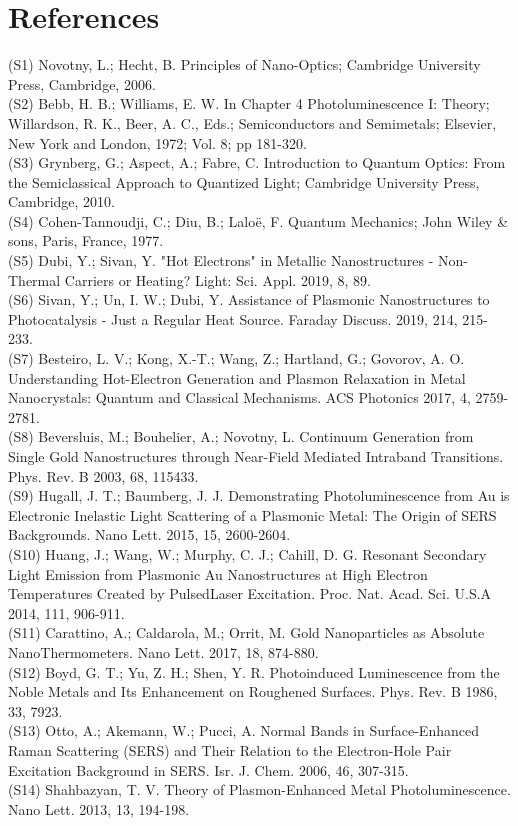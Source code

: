 \documentclass[10pt]{article}
\begin{document}
\section*{References}
(S1) Novotny, L.; Hecht, B. Principles of Nano-Optics; Cambridge University Press, Cambridge, 2006.\\
(S2) Bebb, H. B.; Williams, E. W. In Chapter 4 Photoluminescence I: Theory; Willardson, R. K., Beer, A. C., Eds.; Semiconductors and Semimetals; Elsevier, New York and London, 1972; Vol. 8; pp 181-320.\\
(S3) Grynberg, G.; Aspect, A.; Fabre, C. Introduction to Quantum Optics: From the Semiclassical Approach to Quantized Light; Cambridge University Press, Cambridge, 2010.\\
(S4) Cohen-Tannoudji, C.; Diu, B.; Laloë, F. Quantum Mechanics; John Wiley \& sons, Paris, France, 1977.\\
(S5) Dubi, Y.; Sivan, Y. "Hot Electrons" in Metallic Nanostructures - Non-Thermal Carriers or Heating? Light: Sci. Appl. 2019, 8, 89.\\
(S6) Sivan, Y.; Un, I. W.; Dubi, Y. Assistance of Plasmonic Nanostructures to Photocatalysis - Just a Regular Heat Source. Faraday Discuss. 2019, 214, 215-233.\\
(S7) Besteiro, L. V.; Kong, X.-T.; Wang, Z.; Hartland, G.; Govorov, A. O. Understanding Hot-Electron Generation and Plasmon Relaxation in Metal Nanocrystals: Quantum and Classical Mechanisms. ACS Photonics 2017, 4, 2759-2781.\\
(S8) Beversluis, M.; Bouhelier, A.; Novotny, L. Continuum Generation from Single Gold Nanostructures through Near-Field Mediated Intraband Transitions. Phys. Rev. B 2003, 68, 115433.\\
(S9) Hugall, J. T.; Baumberg, J. J. Demonstrating Photoluminescence from Au is Electronic Inelastic Light Scattering of a Plasmonic Metal: The Origin of SERS Backgrounds. Nano Lett. 2015, 15, 2600-2604.\\
(S10) Huang, J.; Wang, W.; Murphy, C. J.; Cahill, D. G. Resonant Secondary Light Emission from Plasmonic Au Nanostructures at High Electron Temperatures Created by PulsedLaser Excitation. Proc. Nat. Acad. Sci. U.S.A 2014, 111, 906-911.\\
(S11) Carattino, A.; Caldarola, M.; Orrit, M. Gold Nanoparticles as Absolute NanoThermometers. Nano Lett. 2017, 18, 874-880.\\
(S12) Boyd, G. T.; Yu, Z. H.; Shen, Y. R. Photoinduced Luminescence from the Noble Metals and Its Enhancement on Roughened Surfaces. Phys. Rev. B 1986, 33, 7923.\\
(S13) Otto, A.; Akemann, W.; Pucci, A. Normal Bands in Surface-Enhanced Raman Scattering (SERS) and Their Relation to the Electron-Hole Pair Excitation Background in SERS. Isr. J. Chem. 2006, 46, 307-315.\\
(S14) Shahbazyan, T. V. Theory of Plasmon-Enhanced Metal Photoluminescence. Nano Lett. 2013, 13, 194-198.
\end{document}
